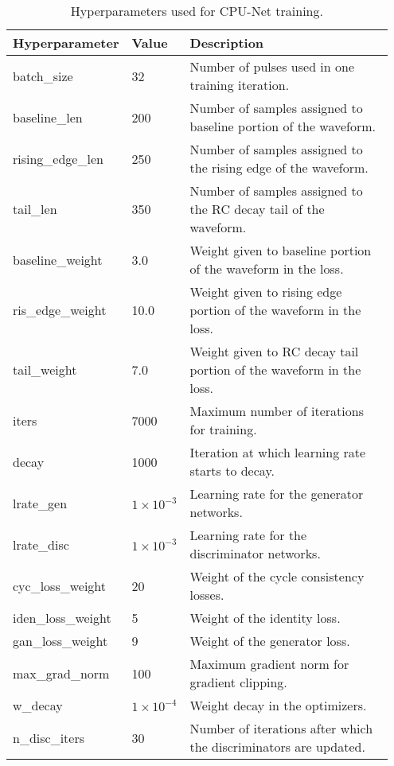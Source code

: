 \begin{table}[ht!]
\centering
\renewcommand{\arraystretch}{1.5} %
\setlength{\tabcolsep}{2pt} %
\begin{tabular}{|p{0.18\linewidth}|p{0.12\linewidth}|p{0.65\linewidth}|}
\hline
\textbf{Hyperparameter}       & \textbf{Value} & \textbf{Description} \\ \hline
batch\_size          & 32             & Number of pulses used in one training iteration. \\ \hline
baseline\_len        & 200            & Number of samples assigned to baseline portion of the waveform. \\ \hline
rising\_edge\_len    & 250            & Number of samples assigned to the rising edge of the waveform. \\ \hline
tail\_len            & 350            & Number of samples assigned to the RC decay tail of the waveform. \\ \hline
baseline\_weight     & 3.0            & Weight given to baseline portion of the waveform in the loss. \\ \hline
ris\_edge\_weight    & 10.0           & Weight given to rising edge portion of the waveform in the loss. \\ \hline
tail\_weight         & 7.0            & Weight given to RC decay tail portion of the waveform in the loss. \\ \hline
iters                & 7000           & Maximum number of iterations for training. \\ \hline
decay                & 1000           & Iteration at which learning rate starts to decay. \\ \hline
lrate\_gen           & $1 \times 10^{-3}$ & Learning rate for the generator networks. \\ \hline
lrate\_disc          & $1 \times 10^{-3}$ & Learning rate for the discriminator networks. \\ \hline
cyc\_loss\_weight    & 20             & Weight of the cycle consistency losses.  \\ \hline
iden\_loss\_weight   & 5              & Weight of the identity loss. \\ \hline
gan\_loss\_weight    & 9              & Weight of the generator loss. \\ \hline
max\_grad\_norm      & 100            & Maximum gradient norm for gradient clipping. \\ \hline
w\_decay             & $1 \times 10^{-4}$ & Weight decay in the optimizers. \\ \hline
n\_disc\_iters       & 30             & Number of iterations after which the discriminators are updated. \\ \hline
\end{tabular}
\caption{Hyperparameters used for CPU-Net training.}
\label{tab:hyperparameters}
\end{table}
